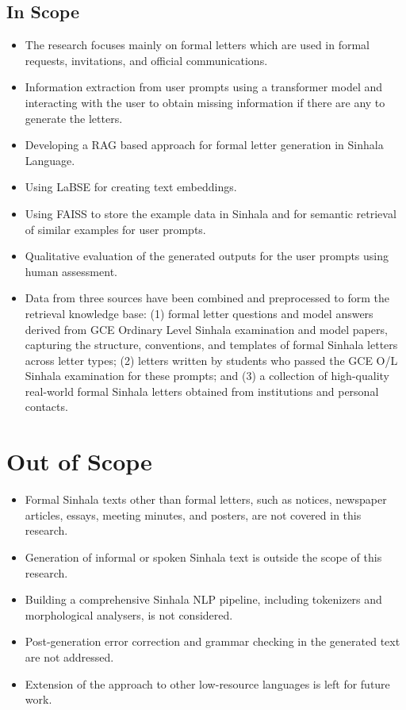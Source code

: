 \documentclass[12pt]{uomthesis}
\begin{document}
\subsection{In Scope}

\begin{itemize}
    \item The research focuses mainly on formal letters which are used in formal requests, invitations, and official communications.
    \item Information extraction from user prompts using a transformer model and interacting with the user to obtain missing information if there are any to generate the letters. 
    \item Developing a RAG based approach for formal letter generation in Sinhala Language.
    \item Using LaBSE for creating text embeddings.
    \item Using FAISS to store the example data in Sinhala and for semantic retrieval of similar examples for user prompts.
    \item Qualitative evaluation of the generated outputs for the user prompts using human assessment. 
    \item Data from three sources have been combined and preprocessed to form the retrieval knowledge base: (1) formal letter questions and model answers derived from GCE Ordinary Level Sinhala examination and model papers, capturing the structure, conventions, and templates of formal Sinhala letters across letter types; (2) letters written by students who passed the GCE O/L Sinhala examination for these prompts; and (3) a collection of high-quality real-world formal Sinhala letters obtained from institutions and personal contacts.
\end{itemize}

\section{Out of Scope}

\begin{itemize}
    \item Formal Sinhala texts other than formal letters, such as notices, newspaper articles, essays, meeting minutes, and posters, are not covered in this research.
    \item Generation of informal or spoken Sinhala text is outside the scope of this research.
    \item Building a comprehensive Sinhala NLP pipeline, including tokenizers and morphological analysers, is not considered.
    \item Post-generation error correction and grammar checking in the generated text are not addressed.
    \item Extension of the approach to other low-resource languages is left for future work.
\end{itemize}
\end{document}
